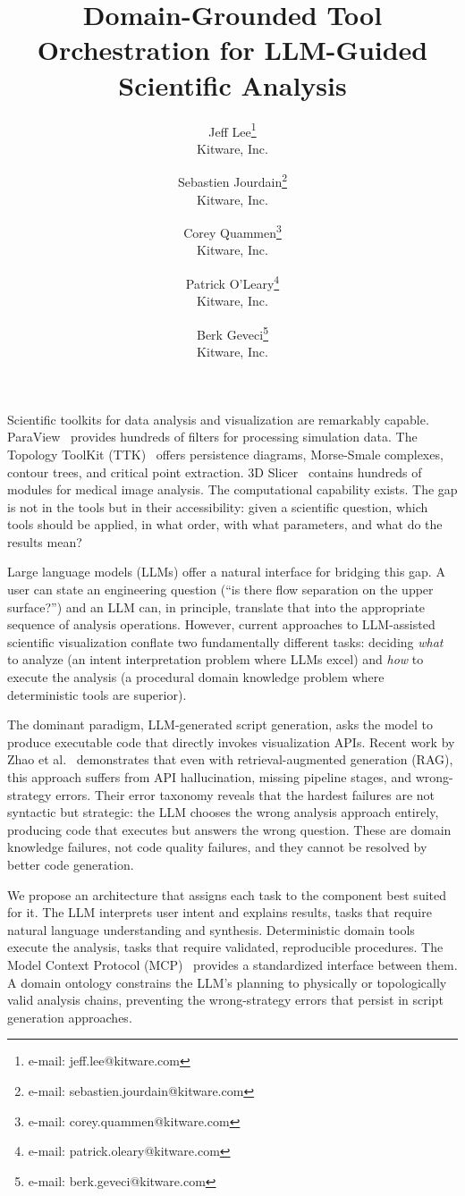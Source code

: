 \documentclass{vgtc}                          %
\title{Domain-Grounded Tool Orchestration for LLM-Guided Scientific Analysis}
\author{Jeff Lee\thanks{e-mail: jeff.lee@kitware.com}\\ %
        \scriptsize Kitware, Inc. %
\and Sebastien Jourdain\thanks{e-mail: sebastien.jourdain@kitware.com}\\ %
     \scriptsize Kitware, Inc. %
\and Corey Quammen\thanks{e-mail: corey.quammen@kitware.com}\\ %
     \scriptsize Kitware, Inc. %
\and Patrick O'Leary\thanks{e-mail: patrick.oleary@kitware.com}\\ %
     \scriptsize Kitware, Inc. %
\and Berk Geveci\thanks{e-mail: berk.geveci@kitware.com}\\ %
     \scriptsize Kitware, Inc.}
\begin{document}

\maketitle

Scientific toolkits for data analysis and visualization are remarkably capable.
ParaView~\cite{Ahrens:2005:PEO} provides hundreds of filters for processing
simulation data.
The Topology ToolKit (TTK)~\cite{Tierny:2018:TTK} offers persistence diagrams,
Morse-Smale complexes, contour trees, and critical point extraction.
3D Slicer~\cite{Fedorov:2012:3DS} contains hundreds of modules for medical
image analysis.
The computational capability exists.
The gap is not in the tools but in their accessibility: given a scientific
question, which tools should be applied, in what order, with what parameters,
and what do the results mean?

Large language models (LLMs) offer a natural interface for bridging this gap.
A user can state an engineering question (``is there flow separation on the
upper surface?'') and an LLM can, in principle, translate that into the
appropriate sequence of analysis operations.
However, current approaches to LLM-assisted scientific visualization conflate
two fundamentally different tasks: deciding \textit{what} to analyze (an intent
interpretation problem where LLMs excel) and \textit{how} to execute the
analysis (a procedural domain knowledge problem where deterministic tools are
superior).

The dominant paradigm, LLM-generated script generation, asks the model to produce
executable code that directly invokes visualization APIs.
Recent work by Zhao et al.~\cite{Zhao:2026:RAG} demonstrates that even with
retrieval-augmented generation (RAG), this approach suffers from API
hallucination, missing pipeline stages, and wrong-strategy errors.
Their error taxonomy reveals that the hardest failures are not syntactic but
strategic: the LLM chooses the wrong analysis approach entirely, producing code
that executes but answers the wrong question.
These are domain knowledge failures, not code quality failures, and they cannot
be resolved by better code generation.

We propose an architecture that assigns each task to the component best suited
for it.
The LLM interprets user intent and explains results, tasks that require natural
language understanding and synthesis.
Deterministic domain tools execute the analysis, tasks that require validated,
reproducible procedures.
The Model Context Protocol (MCP)~\cite{MCP:2024} provides a standardized
interface between them.
A domain ontology constrains the LLM's planning to physically or topologically
valid analysis chains, preventing the wrong-strategy errors that persist in
script generation approaches.
\end{document}
